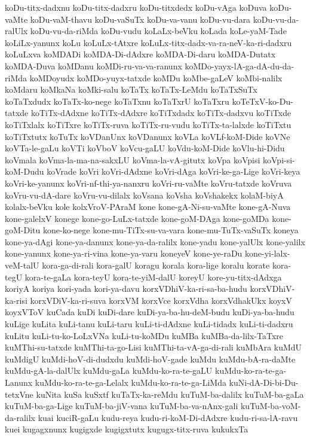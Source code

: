 {koDu-titx-dadxnu
koDu-titx-dadxru
koDu-titxdedx
koDu-vAga
koDuva
koDu-vaMte
koDu-vaM-thavu
koDu-vaSuTx
koDu-va-vanu
koDu-vu-dara
koDu-vu-da-ralUlx
koDu-vu-da-riMda
koDu-vudu
koLaLx-beVku
koLada
koLe-yaM-Tade
koLiLx-yanunx
koLu
koLuLx-tAtxre
koLuLx-titx-dadx-va-ra-neV-ka-ri-dadxru
koLuLxva
koMDADi
koMDA-Di-dAdxre
koMDA-Di-daru
koMDA-Dutatx
koMDA-Duva
koMDanu
koMDi-ru-va-va-ranunx
koMDo-yayx-lA-ga-dA-du-da-riMda
koMDoyudx
koMDo-yuyx-tatxde
koMDu
koMbe-gaLeV
koMbi-nalilx
koMdaru
koMkaNa
koMki-salu
koTaTx
koTaTx-LeMdu
koTaTxSuTx
koTaTxdudx
koTaTx-ko-nege
koTaTxnu
koTaTxrU
koTaTxru
koTeTxV-ko-Du-tatxde
koTiTx-dAdxne
koTiTx-dAdxre
koTiTxdadx
koTiTx-dadxvu
koTiTxde
koTiTxlalx
koTiTxre
koTiTx-ruva
koTiTx-ru-vudu
koTiTx-ta-lalxde
koTiTxtu
koTiTxtutx
koTuTx
koVDanUnx
koVDanunx
koVLa
koVLf-koM-Dide
koVNe
koVTa-le-gaLu
koVTi
koVboV
koVcu-gaLU
koVdu-koM-Dide
koVlu-hi-Didu
koVmala
koVma-la-ma-na-sakxLU
koVma-la-vA-gitutx
koVpa
koVpisi
koVpi-si-koM-Dudu
koVrade
koVri
koVri-dAdxne
koVri-dAga
koVri-ke-ga-Lige
koVri-keya
koVri-ke-yanunx
koVri-nf-thi-ya-nanxru
koVri-ru-vaMte
koVru-tatxde
koVruva
koVru-vu-dA-dare
koVru-vu-dilalx
koVsana
koVsha
koVshakekx
kolaM-biyA
kolalx-beVku
kole
kolxVroV-PAraM
kone
kone-gA-Ni-su-vaMte
kone-gA-Nuva
kone-galelxV
konege
kone-go-LuLx-tatxde
kone-goM-DAga
kone-goMDa
kone-goM-Ditu
kone-ko-nege
kone-mu-TiTx-su-va-vara
kone-mu-TuTx-vaSuTx
koneya
kone-ya-dAgi
kone-ya-danunx
kone-ya-da-ralilx
kone-yadu
kone-yalUlx
kone-yalilx
kone-yanunx
kone-ya-ri-vina
kone-ya-varu
koneyeV
kone-ye-raDu
kone-yi-lalx-veM-talU
kora-ga-di-rali
kora-galU
koragu
korala
kora-lige
koralu
korate
kora-tegU
kora-te-gaLa
kora-teyU
kora-te-yiM-dalU
koreyU
kore-yu-titx-dAdxga
koriyA
koriya
kori-yada
kori-ya-davu
korxVDhiV-ka-ri-sa-ba-hudu
korxVDhiV-ka-risi
korxVDiV-ka-ri-suva
korxVM
korxVce
korxVdha
korxVdhakUkx
koyxV
koyxVToV
kuCada
kuDi
kuDi-dare
kuDi-ya-ba-hu-deM-budu
kuDi-ya-ba-hudu
kuLige
kuLita
kuLi-tanu
kuLi-taru
kuLi-ti-dAdxne
kuLi-tidadx
kuLi-ti-dadxru
kuLitu
kuLi-tu-ko-LoLxVNa
kuLi-tu-koMDu
kuMBa
kuMBa-da-lilx-TaTxre
kuMThi-su-tatxde
kuMThi-ta-go-Lisi
kuMThi-ta-vA-ga-di-rali
kuMbAra
kuMdU
kuMdigU
kuMdi-hoV-di-dudxdu
kuMdi-hoV-gade
kuMdu
kuMdu-bA-ra-daMte
kuMdu-gA-la-dalUlx
kuMdu-gaLa
kuMdu-ko-ra-te-gaLU
kuMdu-ko-ra-te-ga-Lanunx
kuMdu-ko-ra-te-ga-Lelalx
kuMdu-ko-ra-te-ga-LiMda
kuNi-dA-Di-bi-Du-tetxVne
kuNita
kuSa
kuSxtf
kuTaTx-ka-reMdu
kuTuM-ba-dalilx
kuTuM-ba-gaLa
kuTuM-ba-ga-Lige
kuTuM-ba-jiV-vana
kuTuM-ba-va-nAnx-gali
kuTuM-ba-voM-da-ralilx
kuai
kuciR-gaLu
kudu-reya
kudu-ri-koM-Di-dAdxre
kudu-ri-sa-lA-ravu
kuei
kugagxnunx
kugigxde
kugigxtutx
kugugx-titx-ruva
kukukxTa
}
